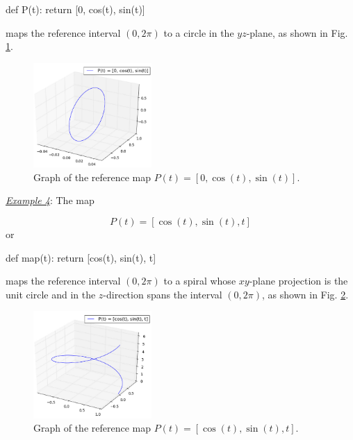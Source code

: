 \begin{bbox}
def P(t): return [0, cos(t), sin(t)]
\end{bbox}
maps the reference interval $(0, 2\pi)$ to a circle in the 
$yz$-plane, as shown in Fig. \ref{fig:paramcu3}.

\newpage
\begin{figure}[!ht]
\begin{center}
\includegraphics[width=0.4\textwidth]{img/paramcu3.png}
\end{center}
\vspace{-6mm}
\caption{Graph of the reference map $P(t) = [0, \cos(t), \sin(t)]$.}
\label{fig:paramcu3}
\end{figure}
\noindent
\underline{\em Example 4}: The map

$$
P(t) = [\cos(t), \sin(t), t]
$$
or

\begin{bbox}
def map(t):
    return [cos(t), sin(t), t]
\end{bbox}
maps the reference interval $(0, 2\pi)$ to a spiral whose 
$xy$-plane projection is the unit circle and in the $z$-direction 
spans the interval $(0, 2\pi)$, as shown in Fig. \ref{fig:paramcu4}.

\begin{figure}[!ht]
\begin{center}
\includegraphics[width=0.4\textwidth]{img/paramcu4.png}
\end{center}
\vspace{-6mm}
\caption{Graph of the reference map $P(t) = [\cos(t), \sin(t), t]$.}
\label{fig:paramcu4}
\end{figure}
\noindent

